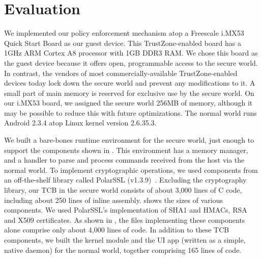\section{Evaluation}
\label{section:evaluation}

We implemented our policy enforcement mechanism atop a Freescale i.MX53 Quick
Start Board as our guest device. This TrustZone-enabled board has a 1GHz ARM
Cortex A8 processor with 1GB DDR3 RAM. We chose this board as the guest device
because it offers open, programmable access to the secure world. In contrast,
the vendors of most commercially-available TrustZone-enabled devices today lock
down the secure world and prevent any modifications to it. A small part of main
memory is reserved for exclusive use by the secure world. On our i.MX53 board,
we assigned the secure world 256MB of memory, although it may be possible to
reduce this with future optimizations. The normal world runs Android 2.3.4 atop
Linux kernel version 2.6.35.3.

We built a bare-bones runtime environment for the secure world, just enough to
support the components shown in . This environment has a
memory manager, and a handler to parse and process commands received from the
host via the normal world. To implement cryptographic operations, we used
components from an off-the-shelf library called PolarSSL
(v1.3.9)~\cite{polarssl}. Excluding the cryptography library, our TCB in the
secure world consists of about 3,000 lines of C code, including about 250 lines
of inline assembly.  shows the sizes of various components.
We used PolarSSL's implementation of SHA1 and HMACs, RSA and X509 certificates.
As shown in , the files implementing these components alone
comprise only about 4,000 lines of code. In addition to these TCB components,
we built the kernel module and the UI app (written as a simple, native daemon) 
for the normal world, together comprising 165 lines of code.
%

